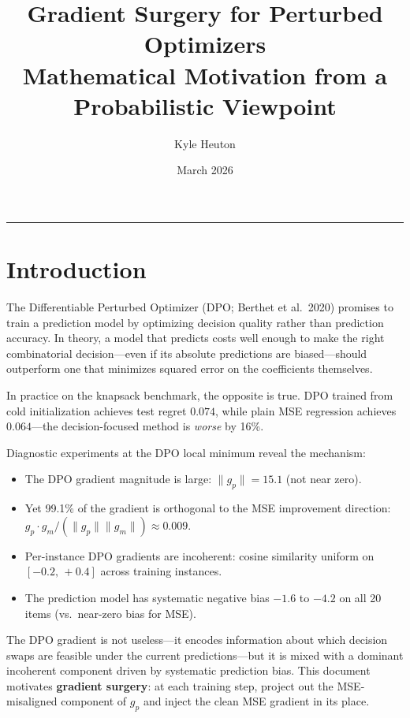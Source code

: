 \documentclass[11pt]{article}
\title{\textbf{Gradient Surgery for Perturbed Optimizers}\\
\large Mathematical Motivation from a Probabilistic Viewpoint}
\author{Kyle Heuton}
\date{March 2026}
\begin{document}
\maketitle
\thispagestyle{empty}

\tableofcontents
\vspace{1em}
\hrule
\vspace{1em}

\section{Introduction}

The Differentiable Perturbed Optimizer (DPO; Berthet et al.\ 2020) promises to
train a prediction model by optimizing decision quality rather than prediction
accuracy.  In theory, a model that predicts costs well enough to make the right
combinatorial decision---even if its absolute predictions are biased---should
outperform one that minimizes squared error on the coefficients themselves.

In practice on the knapsack benchmark, the opposite is true.  DPO trained from
cold initialization achieves test regret $0.074$, while plain MSE regression
achieves $0.064$---the decision-focused method is \emph{worse} by 16\%.

Diagnostic experiments at the DPO local minimum reveal the mechanism:
\begin{itemize}[itemsep=2pt]
  \item The DPO gradient magnitude is large: $\|g_p\| = 15.1$ (not near zero).
  \item Yet 99.1\% of the gradient is orthogonal to the MSE improvement
        direction: $g_p \cdot g_m / (\|g_p\|\|g_m\|) \approx 0.009$.
  \item Per-instance DPO gradients are incoherent: cosine similarity uniform on
        $[-0.2,\, +0.4]$ across training instances.
  \item The prediction model has systematic negative bias $-1.6$ to $-4.2$ on
        all 20 items (vs.\ near-zero bias for MSE).
\end{itemize}

The DPO gradient is not useless---it encodes information about which decision
swaps are feasible under the current predictions---but it is mixed with a
dominant incoherent component driven by systematic prediction bias.  This document
motivates \textbf{gradient surgery}: at each training step, project out the
MSE-misaligned component of $g_p$ and inject the clean MSE gradient in its place.
\end{document}
